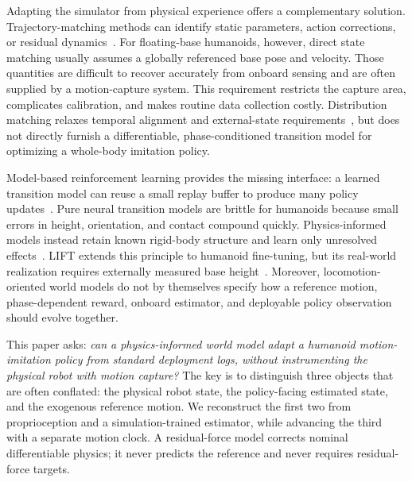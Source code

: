 \documentclass[10pt,twocolumn]{article}
\begin{document}
Adapting the simulator from physical experience offers a complementary solution. Trajectory-matching methods can identify static parameters, action corrections, or residual dynamics~\cite{jiang2021simgan,heiden2021neuralsim,he2025asap}. For floating-base humanoids, however, direct state matching usually assumes a globally referenced base pose and velocity. Those quantities are difficult to recover accurately from onboard sensing and are often supplied by a motion-capture system. This requirement restricts the capture area, complicates calibration, and makes routine data collection costly. Distribution matching relaxes temporal alignment and external-state requirements~\cite{dao2026distribution}, but does not directly furnish a differentiable, phase-conditioned transition model for optimizing a whole-body imitation policy.

Model-based reinforcement learning provides the missing interface: a learned transition model can reuse a small replay buffer to produce many policy updates~\cite{chua2018pets,janner2019mbpo,hafner2023dreamerv3}. Pure neural transition models are brittle for humanoids because small errors in height, orientation, and contact compound quickly. Physics-informed models instead retain known rigid-body structure and learn only unresolved effects~\cite{raissi2019pinn,cranmer2020lagrangian,lutter2019deep,levy2024three}. LIFT extends this principle to humanoid fine-tuning, but its real-world realization requires externally measured base height~\cite{huang2026lift}. Moreover, locomotion-oriented world models do not by themselves specify how a reference motion, phase-dependent reward, onboard estimator, and deployable policy observation should evolve together.

This paper asks: \emph{can a physics-informed world model adapt a humanoid motion-imitation policy from standard deployment logs, without instrumenting the physical robot with motion capture?} The key is to distinguish three objects that are often conflated: the physical robot state, the policy-facing estimated state, and the exogenous reference motion. We reconstruct the first two from proprioception and a simulation-trained estimator, while advancing the third with a separate motion clock. A residual-force model corrects nominal differentiable physics; it never predicts the reference and never requires residual-force targets.
\end{document}
